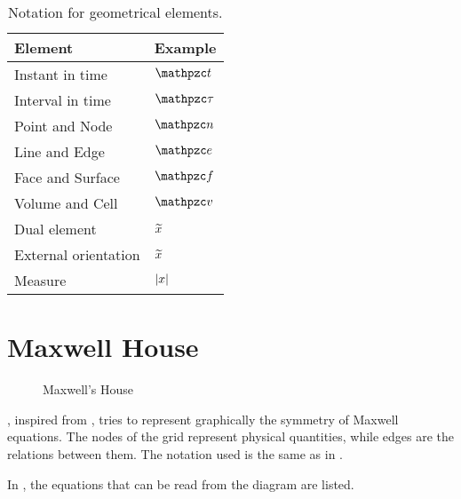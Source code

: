 \begin{table}[htbp]
  \begin{center}
    \begin{tabular}{ll}
      \hline
      Element & Example\\
      \hline
      Instant in time & $\Instant{t}$ \\
      Interval in time & $\Interval{\tau}$ \\
      Point and Node & $\Point{n}$ \\
      Line and Edge & $\Line{e}$ \\
      Face and Surface & $\Surface{f}$ \\
      Volume and Cell & $\Volume{v}$ \\
      Dual element & $\widetilde{x}$ \\
      External orientation\index{Orientation!external} & $\widetilde{x}$ \\
      Measure & ${\left\lvert x\right\rvert}$ \\
      \hline
    \end{tabular}
  \end{center}
  \caption{Notation for geometrical elements.}
  \label{tab:notation_geometrical}
\end{table}

\chapter{Maxwell House}  \label{app:maxwell_house}

\begin{figure}[htbp]
  \begin{center}
    \resizebox{10cm}{!}{}
  \end{center}
  \caption{Maxwell's House}
  \label{fig:maxwell_house}
\end{figure}

, inspired from
\cite{bossavit_computational}, tries to represent graphically the
symmetry of Maxwell equations. The nodes of the grid represent
physical quantities, while edges are the relations between them. The
notation used is the same as in \cite{bossavit_computational}.

In , the equations that can be read from the
diagram are listed.

